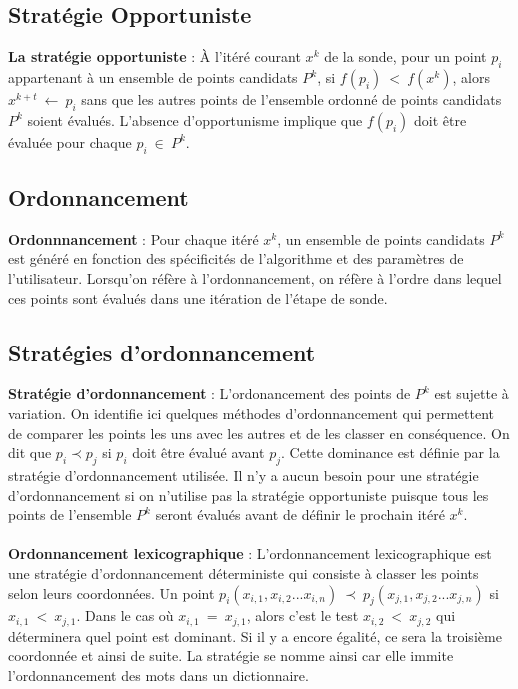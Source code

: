 \documentclass[letterpaper]{scrartcl}
\begin{document}
\subsection{Stratégie Opportuniste}
\textbf{La stratégie opportuniste} : À l'itéré courant $x^{k}$ de la sonde, pour un point $p_i$ appartenant à un ensemble de points candidats $P^k$, si $f(p_i)\ < \ f(x^k)$, alors $x^{k+t}\ \leftarrow \ p_i$ sans que les autres points de l'ensemble ordonné de points candidats $P^k$ soient évalués. L'absence d'opportunisme implique que $f(p_i)$ doit être évaluée pour chaque $p_i \ \in \ P^k$. 
\subsection{Ordonnancement}
\textbf{Ordonnnancement} : Pour chaque itéré $x^k$, un ensemble de points candidats $P^k$ est généré en fonction des spécificités de l'algorithme et des paramètres de l'utilisateur. Lorsqu'on réfère à l'ordonnancement, on réfère à l'ordre dans lequel ces points sont évalués dans une itération de l'étape de sonde. 
\subsection{Stratégies d'ordonnancement}
\textbf{Stratégie d'ordonnancement} : L'ordonancement des points de $P^k$ est sujette à variation. On identifie ici quelques méthodes d'ordonnancement qui permettent de comparer les points les uns avec les autres et de les classer en conséquence. On dit que $p_i \prec p_j$ si $p_i$ doit être évalué avant $p_j$. Cette dominance est définie par la stratégie d'ordonnancement utilisée. Il n'y a aucun besoin pour une stratégie d'ordonnancement si on n'utilise pas la stratégie opportuniste puisque tous les points de l'ensemble $P^k$ seront évalués avant de définir le prochain itéré $x^k$. \\\\

\indent \textbf{Ordonnancement lexicographique} : L'ordonnancement lexicographique est une stratégie d'ordonnancement déterministe qui consiste à classer les points selon leurs coordonnées. Un point $p_i(x_{i,1},x_{i,2}...x_{i,n}) \ \prec \ p_j(x_{j,1},x_{j,2}...x_{j,n})$ si $x_{i,1}\ <\ x_{j,1}$. Dans le cas où $x_{i,1}\ =\ x_{j,1}$, alors c'est le test $x_{i,2}\ <\ x_{j,2}$ qui déterminera quel point est dominant. Si il y a encore égalité, ce sera la troisième coordonnée et ainsi de suite. La stratégie se nomme ainsi car elle immite l'ordonnancement des mots dans un dictionnaire.\\\\
\end{document}
